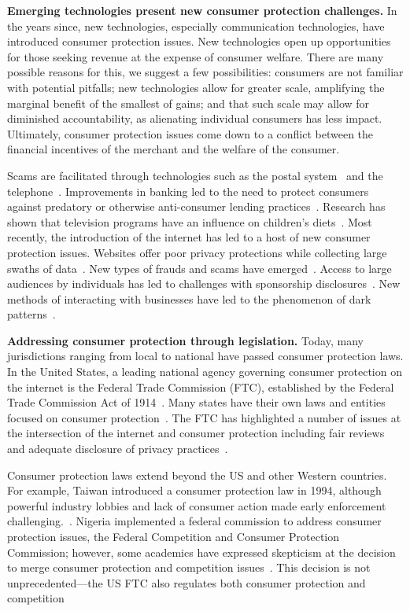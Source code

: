 \textbf{Emerging technologies present new consumer protection challenges.}
In the years since, new technologies, especially communication technologies, have introduced consumer protection issues. New technologies open up opportunities for those seeking revenue at the expense of consumer welfare. There are many possible reasons for this, we suggest a few possibilities: consumers are not familiar with potential pitfalls; new technologies allow for greater scale, amplifying the marginal benefit of the smallest of gains; and that such scale may allow for diminished accountability, as alienating individual consumers has less impact. Ultimately, consumer protection issues come down to a conflict between the financial incentives of the merchant and the welfare of the consumer.

Scams are facilitated through technologies such as the postal system~\cite{uspismailfraud} and the telephone~\cite{ftcphonescams}. Improvements in banking led to the need to protect consumers against predatory or otherwise anti-consumer lending practices~\cite{eaglesham2011warning,doddfrank}. Research has shown that television programs have an influence on children's diets~\cite{morton1985television}. Most recently, the introduction of the internet has led to a host of new consumer protection issues. Websites offer poor privacy protections while collecting large swaths of data~\cite{estrada2017online}. New types of frauds and scams have emerged~\cite{ftcscamalerts}. Access to large audiences by individuals has led to challenges with sponsorship disclosures~\cite{ftc2021disclosures}. New methods of interacting with businesses have led to the phenomenon of dark patterns~\cite{darkpatternsorg}.

\textbf{Addressing consumer protection through legislation.}
Today, many jurisdictions ranging from local to national have passed consumer protection laws. In the United States, a leading national agency governing consumer protection on the internet is the Federal Trade Commission (FTC), established by the Federal Trade Commission Act of 1914~\cite{ftcact}. Many states have their own laws and entities focused on consumer protection~\cite{waller2011consumer}. The FTC has highlighted a number of issues at the intersection of the internet and consumer protection including fair reviews and adequate disclosure of privacy practices~\cite{ftc20approves,ftc21notice,ftc2021disclosures,ftc-privacy-survey1998,ftc-privacy-survey2000,ftc2021canspam,ftc1997principles}.

Consumer protection laws extend beyond the US and other Western countries. For example, Taiwan introduced a consumer protection law in 1994, although powerful industry lobbies and lack of consumer action made early enforcement challenging.~\cite{juang1997taiwan}. Nigeria implemented a federal commission to address consumer protection issues, the Federal Competition and Consumer Protection Commission; however, some academics have expressed skepticism at the decision to merge consumer protection and competition issues~\cite{tavuyanago2020interface}. This decision is not unprecedented---the US FTC also regulates both consumer protection and competition

